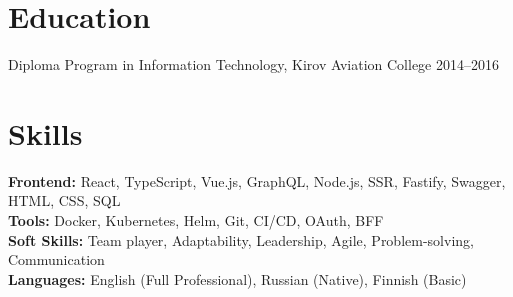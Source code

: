 \documentclass[a4paper,9pt]{article}
\begin{document}
\section{Education}
Diploma Program in Information Technology, Kirov Aviation College \hfill 2014--2016

\section{Skills}
\textbf{Frontend:} React, TypeScript, Vue.js, GraphQL, Node.js, SSR, Fastify, Swagger, HTML, CSS, SQL\\
\textbf{Tools:} Docker, Kubernetes, Helm, Git, CI/CD, OAuth, BFF\\
\textbf{Soft Skills:} Team player, Adaptability, Leadership, Agile, Problem-solving, Communication\\
\textbf{Languages:} English (Full Professional), Russian (Native), Finnish (Basic)

\vfill
{}
\end{document}
